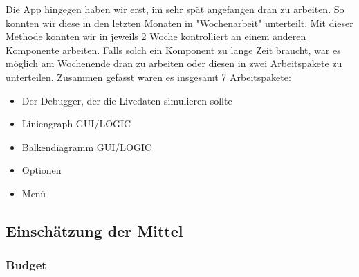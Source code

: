 Die App hingegen haben wir erst, im sehr spät angefangen dran zu arbeiten. So konnten wir diese in den letzten Monaten in "Wochenarbeit" unterteilt. Mit dieser Methode konnten wir in jeweils 2 Woche kontrolliert an einem anderen Komponente arbeiten. Falls solch ein Komponent zu lange Zeit braucht, war es möglich am Wochenende dran zu arbeiten oder diesen in zwei Arbeitspakete zu unterteilen. Zusammen gefasst waren es insgesamt 7 Arbeitspakete:
\begin{itemize}
	\item Der Debugger, der die Livedaten simulieren sollte
	\item Liniengraph GUI/LOGIC
	\item Balkendiagramm GUI/LOGIC
	\item Optionen
	\item Menü
\end{itemize}

\subsection{Einschätzung der Mittel}
\subsubsection{Budget}
\label{subsubsec:Budget}

